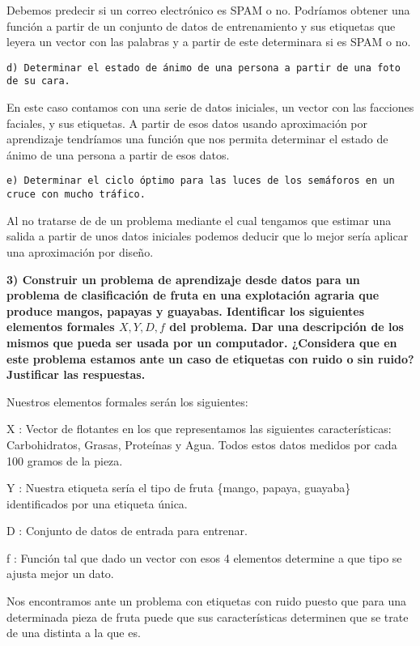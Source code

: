 \documentclass[]{article}
\begin{document}
Debemos predecir si un correo electrónico es SPAM o no. Podríamos
obtener una función a partir de un conjunto de datos de entrenamiento y
sus etiquetas que leyera un vector con las palabras y a partir de este
determinara si es SPAM o no.

\begin{verbatim}
d) Determinar el estado de ánimo de una persona a partir de una foto de su cara.
\end{verbatim}

En este caso contamos con una serie de datos iniciales, un vector con
las facciones faciales, y sus etiquetas. A partir de esos datos usando
aproximación por aprendizaje tendríamos una función que nos permita
determinar el estado de ánimo de una persona a partir de esos datos.

\begin{verbatim}
e) Determinar el ciclo óptimo para las luces de los semáforos en un cruce con mucho tráfico.
\end{verbatim}

Al no tratarse de de un problema mediante el cual tengamos que estimar
una salida a partir de unos datos iniciales podemos deducir que lo mejor
sería aplicar una aproximación por diseño.

\textbf{3) Construir un problema de aprendizaje desde datos para un
problema de clasificación de fruta en una explotación agraria que
produce mangos, papayas y guayabas. Identificar los siguientes elementos
formales \(X , Y, D, f\) del problema. Dar una descripción de los mismos
que pueda ser usada por un computador. ¿Considera que en este problema
estamos ante un caso de etiquetas con ruido o sin ruido? Justificar las
respuestas.}

Nuestros elementos formales serán los siguientes:

X : Vector de flotantes en los que representamos las siguientes
características: Carbohidratos, Grasas, Proteínas y Agua. Todos estos
datos medidos por cada 100 gramos de la pieza.

Y : Nuestra etiqueta sería el tipo de fruta \{mango, papaya, guayaba\}
identificados por una etiqueta única.

D : Conjunto de datos de entrada para entrenar.

f : Función tal que dado un vector con esos 4 elementos determine a que
tipo se ajusta mejor un dato.

Nos encontramos ante un problema con etiquetas con ruido puesto que para
una determinada pieza de fruta puede que sus características determinen
que se trate de una distinta a la que es.
\end{document}
